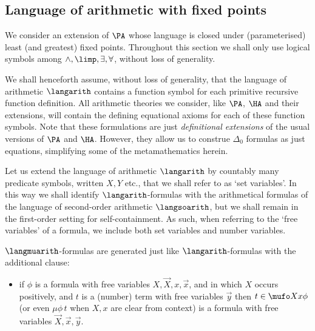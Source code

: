 


\subsection{Language of arithmetic with fixed points}
We consider an extension of $\PA$ whose language is closed under (parameterised) least (and greatest) fixed points.
Throughout this section we shall only use logical symbols among $\land, \limp, \exists , \forall$, without loss of generality.

\begin{convention}
\label{conv:langarith-has-all-pr-symbols}
We shall henceforth assume, without loss of generality, that the language of arithmetic $\langarith$ contains a function symbol for each primitive recursive function definition.
All arithmetic theories we consider, like $\PA$, $\HA$ and their extensions, will contain the defining equational axioms for each of these function symbols.
Note that these formulations are just \emph{definitional extensions} of the usual versions of $\PA$ and $\HA$.
However, they allow us to construe $\Delta_0$ formulas as just equations, simplifying some of the metamathematics herein.
\end{convention}




Let us extend the language of arithmetic $\langarith$ by countably many predicate symbols, written $X,Y$ etc., that we shall refer to as `set variables'. 
In this way we shall identify $\langarith$-formulas with the arithmetical formulas of the language of second-order arithmetic $\langsoarith$, but we shall remain in the first-order setting for self-containment.
As such, when referring to the `free variables' of a formula, we include both set variables and number variables.

$\langmuarith$-formulas are generated just like $\langarith$-formulas with the additional clause:

\begin{itemize}
    \item if $\phi$ is a formula with free variables $X,\vec X, x, \vec x$, and in which $X$ occurs positively, and $t $ is a (number) term with free variables $\vec y$ then $t \in \mufo X x \phi$  (or even $\mu \phi\, t$ when $X,x$ are clear from context) is a formula with free variables $\vec X,\vec x,\vec y$.
\end{itemize}



